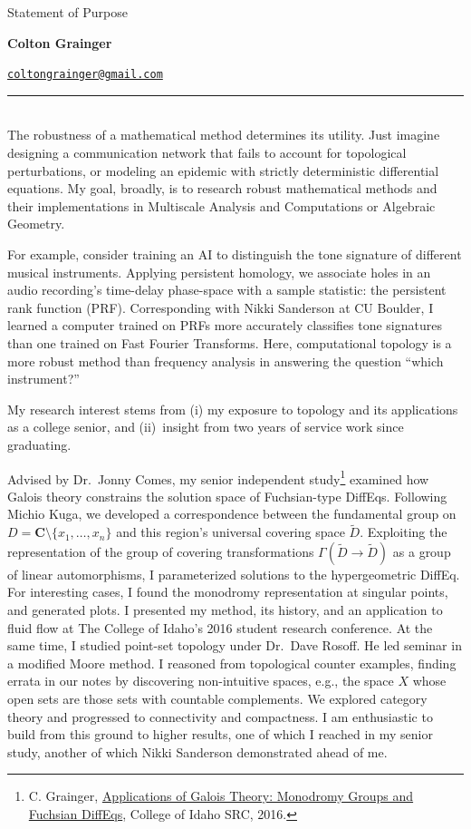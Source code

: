 \documentclass{article}
\makeatletter
\newcommand\textbox[1]{\parbox{.33\textwidth}{#1}}
\newcommand\printheader{\noindent
  \textbox{Statement of Purpose}
  \textbox{\centerline{\large\bf Colton Grainger}}
  \textbox{\raggedleft \href{mailto:coltongrainger@gmail.com}{\texttt{coltongrainger@gmail.com}}\ }

  \vspace{-15pt}
  \noindent
  \rule{\textwidth}{1pt}\\
}
\makeatother
\begin{document}
 

\printheader

The robustness of a mathematical method determines its utility. Just
imagine designing a communication network that fails to account for
topological perturbations, or modeling an epidemic with strictly
deterministic differential equations. My goal, broadly, is to research
robust mathematical methods and their implementations in Multiscale Analysis
and Computations or Algebraic Geometry.

For example, consider training an AI to distinguish the tone signature
of different musical instruments. Applying persistent homology, we
associate holes in an audio recording's time-delay phase-space with a
sample statistic: the persistent rank function (PRF). Corresponding with Nikki
Sanderson at CU Boulder, I learned a computer trained on PRFs more
accurately classifies tone signatures than one trained on Fast Fourier Transforms. 
Here, computational topology is a more robust method than frequency analysis in answering
the question ``which instrument?'' 

My research interest stems from (i) my exposure to topology and its
applications as a college senior, and (ii)~insight from two years of
service work since graduating.

Advised by Dr.~Jonny Comes, my senior independent study\footnote{C.
  Grainger,
  \href{http://coltongrainger.com/documents/cgrainger_coursework_galois_poster.pdf}{Applications
  of Galois Theory: Monodromy Groups and Fuchsian DiffEqs}, College of Idaho SRC, 2016.}
examined how Galois theory constrains the solution space of
Fuchsian-type DiffEqs. Following Michio Kuga, we developed a
correspondence between the fundamental group on
\(D = \mathbf{C}\setminus\{x_1,\ldots,x_n\}\) and this region's
universal covering space \(\tilde{D}\). Exploiting the representation of
the group of covering transformations
\(\Gamma(\tilde{D} \to \tilde{D})\) as a group of linear automorphisms,
I parameterized solutions to the hypergeometric DiffEq. For
interesting cases, I found the monodromy representation at singular
points, and generated plots. I presented my method, its history, and an
application to fluid flow at The College of Idaho's 2016 student
research conference. At the same time, I studied point-set topology
under Dr.~Dave Rosoff. He led seminar in a modified Moore method.
I reasoned from topological counter examples, finding errata in our notes by
discovering non-intuitive spaces, e.g., the space \(X\) whose
open sets are those sets with countable complements.
We explored category theory and progressed to connectivity and compactness. I am
enthusiastic to build from this ground to higher results,
one of which I reached in my senior study, another of which Nikki
Sanderson demonstrated ahead of me.
\end{document}
